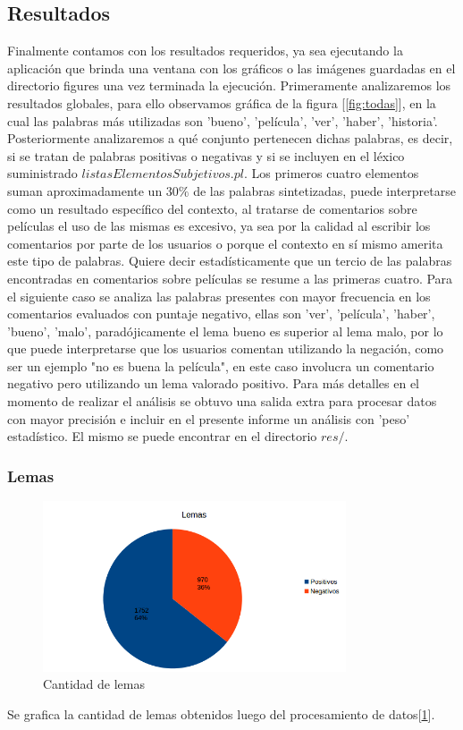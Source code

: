 \documentclass[12pt]{article}
\begin{document}
\subsection{Resultados}
Finalmente contamos con los resultados requeridos, ya sea ejecutando la aplicación que brinda una ventana con los gráficos o las imágenes guardadas en el directorio figures una vez terminada la ejecución.
Primeramente analizaremos los resultados globales, para ello observamos gráfica de la figura [\ref{fig:todas}], en la cual las palabras más utilizadas son 'bueno', 'película', 'ver', 'haber', 'historia'. Posteriormente analizaremos a qué conjunto pertenecen dichas palabras, es decir, si se tratan de palabras positivas o negativas y si se incluyen en el léxico suministrado $listasElementosSubjetivos.pl$. Los primeros cuatro elementos suman aproximadamente un $30 \%$ de las palabras sintetizadas, puede interpretarse como un resultado específico del contexto, al tratarse de comentarios sobre películas el uso de las mismas es excesivo, ya sea por la calidad al escribir los comentarios por parte de los usuarios o porque el contexto en sí mismo amerita este tipo de palabras. Quiere decir estadísticamente que un tercio de las palabras encontradas en comentarios sobre películas se resume a las primeras cuatro.
Para el siguiente caso se analiza las palabras presentes con mayor frecuencia en los comentarios evaluados con puntaje negativo, ellas son 'ver', 'película', 'haber', 'bueno', 'malo', paradójicamente el lema bueno es superior al lema malo, por lo que puede interpretarse que los usuarios comentan utilizando la negación, como ser un ejemplo "no es buena la película", en este caso involucra un comentario negativo pero utilizando un lema valorado positivo. Para más detalles en el momento de realizar el análisis se obtuvo una salida extra para procesar datos con mayor precisión e incluir en el presente informe un análisis con 'peso' estadístico. El mismo se puede encontrar en el directorio $res/$.

\subsubsection{Lemas}
\begin{figure}[!h]
  \centering
    \includegraphics[width=0.8\textwidth]{./fig/Lemas.png}
  \caption{Cantidad de lemas}
  \label{fig:lemas}
\end{figure} 
Se grafica la cantidad de lemas obtenidos luego del procesamiento de datos[\ref{fig:lemas}].
\end{document}
